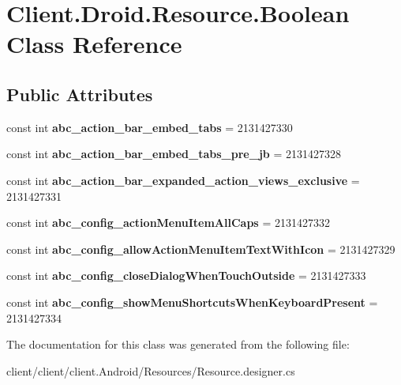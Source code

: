 \hypertarget{classClient_1_1Droid_1_1Resource_1_1Boolean}{}\section{Client.\+Droid.\+Resource.\+Boolean Class Reference}
\label{classClient_1_1Droid_1_1Resource_1_1Boolean}
\subsection*{Public Attributes}
\begin{DoxyCompactItemize}
\item 
\hypertarget{classClient_1_1Droid_1_1Resource_1_1Boolean_a2b1b263818d9a743b0a2db61532b3eb7}{}const int {\bfseries abc\+\_\+action\+\_\+bar\+\_\+embed\+\_\+tabs} = 2131427330\label{classClient_1_1Droid_1_1Resource_1_1Boolean_a2b1b263818d9a743b0a2db61532b3eb7}

\item 
\hypertarget{classClient_1_1Droid_1_1Resource_1_1Boolean_ad779704da815c0cf4cd08483ab954301}{}const int {\bfseries abc\+\_\+action\+\_\+bar\+\_\+embed\+\_\+tabs\+\_\+pre\+\_\+jb} = 2131427328\label{classClient_1_1Droid_1_1Resource_1_1Boolean_ad779704da815c0cf4cd08483ab954301}

\item 
\hypertarget{classClient_1_1Droid_1_1Resource_1_1Boolean_a0bd4861d2cb73adc36fb997fac975dd5}{}const int {\bfseries abc\+\_\+action\+\_\+bar\+\_\+expanded\+\_\+action\+\_\+views\+\_\+exclusive} = 2131427331\label{classClient_1_1Droid_1_1Resource_1_1Boolean_a0bd4861d2cb73adc36fb997fac975dd5}

\item 
\hypertarget{classClient_1_1Droid_1_1Resource_1_1Boolean_a204a3e5ca1aadaf266fdbfac833fc58e}{}const int {\bfseries abc\+\_\+config\+\_\+action\+Menu\+Item\+All\+Caps} = 2131427332\label{classClient_1_1Droid_1_1Resource_1_1Boolean_a204a3e5ca1aadaf266fdbfac833fc58e}

\item 
\hypertarget{classClient_1_1Droid_1_1Resource_1_1Boolean_a4551a320c67925aed1d65e283dd7932c}{}const int {\bfseries abc\+\_\+config\+\_\+allow\+Action\+Menu\+Item\+Text\+With\+Icon} = 2131427329\label{classClient_1_1Droid_1_1Resource_1_1Boolean_a4551a320c67925aed1d65e283dd7932c}

\item 
\hypertarget{classClient_1_1Droid_1_1Resource_1_1Boolean_a6d71fc0176b5d4677151810eed6f2d26}{}const int {\bfseries abc\+\_\+config\+\_\+close\+Dialog\+When\+Touch\+Outside} = 2131427333\label{classClient_1_1Droid_1_1Resource_1_1Boolean_a6d71fc0176b5d4677151810eed6f2d26}

\item 
\hypertarget{classClient_1_1Droid_1_1Resource_1_1Boolean_a85741ec5d4af9900ae53296a022e7b70}{}const int {\bfseries abc\+\_\+config\+\_\+show\+Menu\+Shortcuts\+When\+Keyboard\+Present} = 2131427334\label{classClient_1_1Droid_1_1Resource_1_1Boolean_a85741ec5d4af9900ae53296a022e7b70}

\end{DoxyCompactItemize}


The documentation for this class was generated from the following file\+:\begin{DoxyCompactItemize}
\item 
client/client/client.\+Android/\+Resources/Resource.\+designer.\+cs\end{DoxyCompactItemize}
